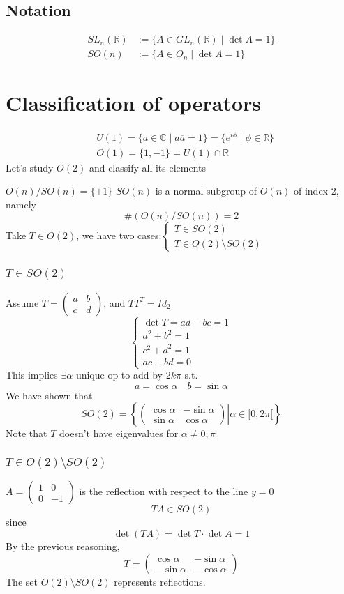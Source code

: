 \documentclass{book}
\newcommand{\leftbracket}{[}
\begin{document}
\section{Notation}
$$\begin{aligned}
    SL_n(\mathbb{R})&:=\{A\in GL_n(\mathbb{R})\mid \det A=1\}\\
    SO(n)&:=\{A\in O_n\mid\det A=1\}
\end{aligned}$$
\chapter{Classification of operators}
$$\begin{aligned}
    &U(1)=\{a\in \mathbb{C}\mid a\overline{a}=1\}=\{e^{i\phi}\mid \phi\in \mathbb{R}\}\\
    &O(1)=\{1,-1\}=U(1)\cap\mathbb{R}
\end{aligned}$$
Let's study $O(2)$ and classify all its elements

$O(n)/SO(n)=\{\pm1\}$ $SO(n)$ is a normal subgroup of $O(n)$ of index 2, namely $$\#(O(n)/SO(n))=2$$
Take $T\in O(2)$, we have two cases:$\begin{cases}
    T\in SO(2)\\T\in O(2)\setminus SO(2)
\end{cases}$
\subsection{$T\in SO(2)$}
Assume $T=\begin{pmatrix}
    a&b\\c&d
\end{pmatrix}$, and $TT^T=Id_2$
$$\begin{cases}
    \det T=ad-bc=1\\a^2+b^2=1\\c^2+d^2=1\\ac+bd=0
\end{cases}$$
This implies $\exists\alpha$ unique op to add by $2k\pi$ s.t.$$a=\cos\alpha\quad b=\sin\alpha$$
We have shown that
$$SO(2)=\left\{\left.\begin{pmatrix}
    \cos\alpha&-\sin\alpha\\\sin\alpha&\cos\alpha
\end{pmatrix}\right| \alpha\in \leftbracket 0,2\pi\leftbracket\right\}$$
Note that $T$ doesn't have eigenvalues for $\alpha\neq 0,\pi$
\subsection{$T\in O(2)\setminus SO(2)$}
$A=\begin{pmatrix}
    1&0\\0&-1
\end{pmatrix}$ is the reflection with respect to the line $y=0$$$TA\in SO(2)$$since $$\det(TA)=\det T\cdot\det A=1$$
By the previous reasoning,$$T=\begin{pmatrix}
    \cos\alpha&-\sin\alpha\\-\sin\alpha&-\cos\alpha
\end{pmatrix}$$
The set $O(2)\setminus SO(2)$ represents reflections.
\end{document}
